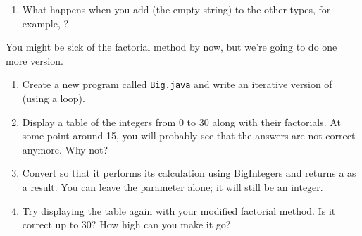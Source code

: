 \begin{exercise}
\begin{enumerate}
\item What happens when you add  (the empty string) to the other types, for example, ?


\end{enumerate}

\end{exercise}


\begin{exercise}  %


You might be sick of the factorial method by now, but we're going to do one more version.

\begin{enumerate}

\item Create a new program called {\tt Big.java} and write an iterative version of  (using a  loop).

\item Display a table of the integers from 0 to 30 along with their factorials.
At some point around 15, you will probably see that the answers are not correct anymore.
Why not?

\item Convert  so that it performs its calculation using BigIntegers and returns a  as a result.
You can leave the parameter alone; it will still be an integer.

\item Try displaying the table again with your modified factorial method.
Is it correct up to 30?
How high can you make it go?

\end{enumerate}

\end{exercise}


